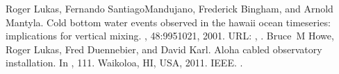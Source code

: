 \documentclass[a4paper,10pt,english,openany,oneside]{sphinxmanual}
\begin{document}
\begin{sphinxthebibliography}{10}
\sphinxAtStartPar
Roger Lukas, Fernando Santiago\sphinxhyphen{}Mandujano, Frederick Bingham, and Arnold Mantyla. Cold bottom water events observed in the hawaii ocean time\sphinxhyphen{}series: implications for vertical mixing. , 48:995\textendash{}1021, 2001. URL: , .
\sphinxAtStartPar
Bruce M Howe, Roger Lukas, Fred Duennebier, and David Karl. Aloha cabled observatory installation. In , 1\textendash{}11. Waikoloa, HI, USA, 2011. IEEE. .
\end{sphinxthebibliography}



\renewcommand{\indexname}{Index}
\printindex
\end{document}
